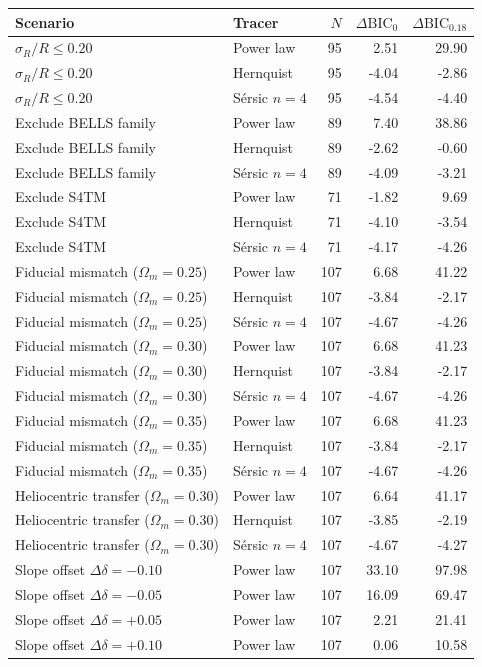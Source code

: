\begin{tabular}{llrrr}
\toprule
Scenario & Tracer & $N$ & $\Delta\mathrm{BIC}_0$ & $\Delta\mathrm{BIC}_{0.18}$ \\
\midrule
$\sigma_R/R\le0.20$ & Power law & 95 & 2.51 & 29.90 \\
$\sigma_R/R\le0.20$ & Hernquist & 95 & -4.04 & -2.86 \\
$\sigma_R/R\le0.20$ & S\'ersic $n=4$ & 95 & -4.54 & -4.40 \\
\addlinespace[3pt]
Exclude BELLS family & Power law & 89 & 7.40 & 38.86 \\
Exclude BELLS family & Hernquist & 89 & -2.62 & -0.60 \\
Exclude BELLS family & S\'ersic $n=4$ & 89 & -4.09 & -3.21 \\
\addlinespace[3pt]
Exclude S4TM & Power law & 71 & -1.82 & 9.69 \\
Exclude S4TM & Hernquist & 71 & -4.10 & -3.54 \\
Exclude S4TM & S\'ersic $n=4$ & 71 & -4.17 & -4.26 \\
\addlinespace[3pt]
Fiducial mismatch ($\Omega_m=0.25$) & Power law & 107 & 6.68 & 41.22 \\
Fiducial mismatch ($\Omega_m=0.25$) & Hernquist & 107 & -3.84 & -2.17 \\
Fiducial mismatch ($\Omega_m=0.25$) & S\'ersic $n=4$ & 107 & -4.67 & -4.26 \\
\addlinespace[3pt]
Fiducial mismatch ($\Omega_m=0.30$) & Power law & 107 & 6.68 & 41.23 \\
Fiducial mismatch ($\Omega_m=0.30$) & Hernquist & 107 & -3.84 & -2.17 \\
Fiducial mismatch ($\Omega_m=0.30$) & S\'ersic $n=4$ & 107 & -4.67 & -4.26 \\
\addlinespace[3pt]
Fiducial mismatch ($\Omega_m=0.35$) & Power law & 107 & 6.68 & 41.23 \\
Fiducial mismatch ($\Omega_m=0.35$) & Hernquist & 107 & -3.84 & -2.17 \\
Fiducial mismatch ($\Omega_m=0.35$) & S\'ersic $n=4$ & 107 & -4.67 & -4.26 \\
\addlinespace[3pt]
Heliocentric transfer ($\Omega_m=0.30$) & Power law & 107 & 6.64 & 41.17 \\
Heliocentric transfer ($\Omega_m=0.30$) & Hernquist & 107 & -3.85 & -2.19 \\
Heliocentric transfer ($\Omega_m=0.30$) & S\'ersic $n=4$ & 107 & -4.67 & -4.27 \\
\addlinespace[3pt]
Slope offset $\Delta\delta=-0.10$ & Power law & 107 & 33.10 & 97.98 \\
\addlinespace[3pt]
Slope offset $\Delta\delta=-0.05$ & Power law & 107 & 16.09 & 69.47 \\
\addlinespace[3pt]
Slope offset $\Delta\delta=+0.05$ & Power law & 107 & 2.21 & 21.41 \\
\addlinespace[3pt]
Slope offset $\Delta\delta=+0.10$ & Power law & 107 & 0.06 & 10.58 \\
\bottomrule
\end{tabular}
